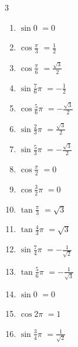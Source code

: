 \begin{multicols}{3}
\begin{enumerate}
  \item $\displaystyle \sin{0}$
        $\displaystyle =0$

\columnbreak %

  \item $\displaystyle \cos{\frac{\pi}{3}}$
        $\displaystyle =\frac{1}{2}$

  \item $\displaystyle \cos{\frac{\pi}{6}}$
        $\displaystyle =\frac{\sqrt{3}}{2}$

  \item $\displaystyle \sin{\frac{7}{6}\pi}$
        $\displaystyle =-\frac{1}{2}$

  \item $\displaystyle \cos{\frac{5}{6}\pi}$
        $\displaystyle =-\frac{\sqrt{3}}{2}$

  \item $\displaystyle \sin{\frac{2}{3}\pi}$
        $\displaystyle =\frac{\sqrt{3}}{2}$

  \item $\displaystyle \sin{\frac{5}{3}\pi}$
        $\displaystyle =-\frac{\sqrt{3}}{2}$

  \item $\displaystyle \cos{\frac{\pi}{2}}$
        $\displaystyle =0$

  \item $\displaystyle \cos{\frac{3}{2}\pi}$
        $\displaystyle =0$

  \item $\displaystyle \tan{\frac{\pi}{3}}$
        $\displaystyle =\sqrt{3}$

  \item $\displaystyle \tan{\frac{4}{3}\pi}$
        $\displaystyle =\sqrt{3}$

  \item $\displaystyle \sin{\frac{7}{4}\pi}$
        $\displaystyle =-\frac{1}{\sqrt{2}}$

  \item $\displaystyle \tan{\frac{5}{6}\pi}$
        $\displaystyle =-\frac{1}{\sqrt{3}}$

  \item $\displaystyle \sin{0}$
        $\displaystyle =0$

  \item $\displaystyle \cos{2\pi}$
        $\displaystyle =1$

  \item $\displaystyle \sin{\frac{3}{4}\pi}$
        $\displaystyle =\frac{1}{\sqrt{2}}$


\end{enumerate}
\end{multicols}
